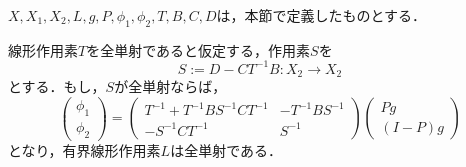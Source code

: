 \begin{thm}
  \label{thm:6.2.1-L全単射}
  $X,X_1,X_2,L,g,P,\phi_1,\phi_2,T,B,C,D$は，本節で定義したものとする．

  線形作用素$T$を全単射であると仮定する，作用素$S$を
  \begin{equation*}
    S:=D-CT^{-1}B : X_2 \rightarrow X_2
  \end{equation*}
  とする．もし，$S$が全単射ならば，
  \begin{equation*}
    \begin{pmatrix}
      \phi_1 \\
      \phi_2
    \end{pmatrix}
    =
    \begin{pmatrix}
      T^{-1}+T^{-1}BS^{-1}CT^{-1} & -T^{-1}BS^{-1} \\
      -S^{-1}CT^{-1} & S^{-1}
    \end{pmatrix}
    \begin{pmatrix}
      Pg \\
      (I-P)g
    \end{pmatrix}
  \end{equation*}
  となり，有界線形作用素$L$は全単射である．
\end{thm}

